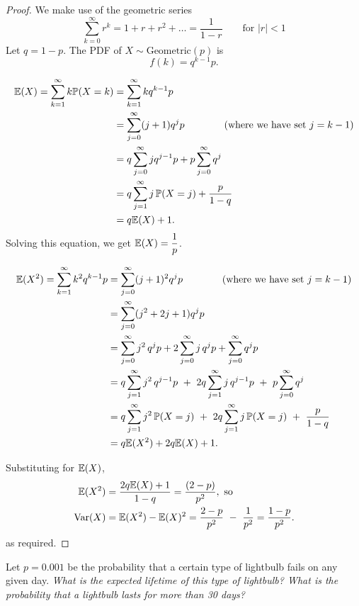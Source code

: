 \begin{proof}
We make use of the geometric series
\[
\sum_{k=0}^\infty r^k = 1 + r + r^2 + \ldots = \frac{1}{1-r} \qquad\text{for }|r|<1
\]
Let $q = 1-p$. The PDF of $X\sim\text{Geometric}(p)$ is
\[
f(k)= q^{k-1}p.
\] 

\begin{align*}
\mathbb{E}(X) = \sum_{k=1}^{\infty} k \mathbb{P}(X=k)
	& = \sum_{k=1}^\infty k q^{k-1} p \\
	& = \sum_{j=0}^\infty (j+1)q^j p 		\qquad \qquad\text{(where we have set $j=k-1$)} \\
	& = q\sum_{j=0}^\infty j q^{j-1} p + p\sum_{j=0}^\infty q^j \\
	& = q\sum_{j=1}^\infty j\,\mathbb{P}(X=j) + \frac{p}{1-q} \\
	& = q\mathbb{E}(X) + 1.
\end{align*}
Solving this equation, we get $\displaystyle \mathbb{E}(X) = \frac{1}{p}$.

\begin{align*}
\mathbb{E}(X^2) = \sum_{k=1}^\infty k^2 q^{k-1}p 
	& = \sum_{j=0}^\infty (j+1)^2 q^j p \qquad \qquad\text{(where we have set $j=k-1$)} \\
	& = \sum_{j=0}^\infty (j^2+2j+1) q^j p \\
	& = \sum_{j=0}^\infty j^2\,q^j p + 2\sum_{j=0}^\infty j\,q^j p + \sum_{j=0}^\infty q^j p \\
	& = q\sum_{j=1}^\infty j^2\,q^{j-1} p \ +\  2q\sum_{j=1}^\infty j\,q^{j-1} p \ +\  p\sum_{j=0}^\infty q^j \\
	& = q\sum_{j=1}^\infty j^2\,\mathbb{P}(X=j) \ +\  2q\sum_{j=1}^\infty j\,\mathbb{P}(X=j) \ +\  \frac{p}{1-q} \\
	& = q\mathbb{E}(X^2) + 2q\mathbb{E}(X) + 1.
\end{align*}

Substituting for $\mathbb{E}(X)$,
\begin{align*}
\expe(X^2)	& = \frac{2q\expe(X)+1}{1-q} = \frac{(2-p)}{p^2}, \text{ so}\\
\var(X) 		& = \expe(X^2)-\expe(X)^2 = \frac{2-p}{p^2} \ -\  \frac{1}{p^2} = \frac{1-p}{p^2}.
\end{align*}
as required.
\end{proof}

\begin{example}
Let $p=0.001$ be the probability that a certain type of lightbulb fails on any given day. 
\ben
\it What is the expected lifetime of this type of lightbulb?
\it What is the probability that a lightbulb lasts for more than 30 days?
\een
\end{example}

